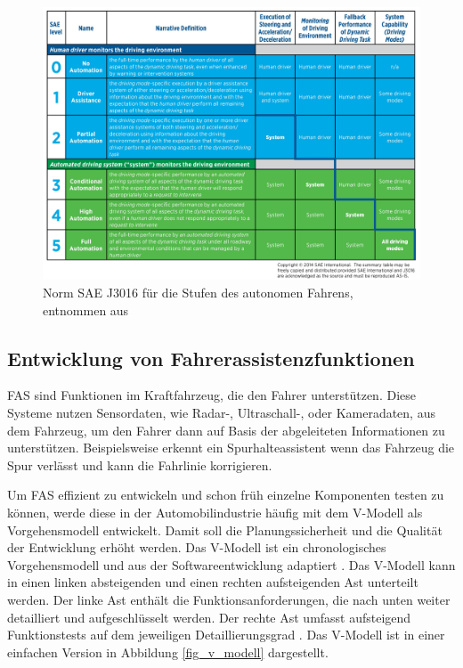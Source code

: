 \begin{figure}[h]
\centering
\includegraphics[scale=0.7]{images/level_autonomes_fahren.jpg}
\caption[Norm SAE J3016 für die Stufen des autonomen Fahrens]{Norm SAE J3016 für die Stufen des autonomen Fahrens, entnommen aus \cite{sae2014taxonomy}}
\label{fig_level_autonomes_fahren}
\end{figure}


\subsection{Entwicklung von Fahrerassistenzfunktionen}
\label{grundlagen_fahren_entwicklung}

\ac{FAS} sind Funktionen im Kraftfahrzeug, die den Fahrer unterstützen. Diese Systeme nutzen Sensordaten, wie Radar-, Ultraschall-, oder Kameradaten, aus dem Fahrzeug, um den Fahrer dann auf Basis der abgeleiteten Informationen zu unterstützen. Beispielsweise erkennt ein Spurhalteassistent wenn das Fahrzeug die Spur verlässt und kann die Fahrlinie korrigieren. 

Um \ac{FAS} effizient zu entwickeln und schon früh einzelne Komponenten testen zu können, werde diese in der Automobilindustrie häufig mit dem V-Modell als Vorgehensmodell entwickelt. Damit soll die Planungssicherheit und die Qualität der Entwicklung erhöht werden. Das V-Modell ist ein chronologisches Vorgehensmodell und aus der Softwareentwicklung adaptiert \cite{vmodell2005}. Das V-Modell kann in einen linken absteigenden und einen rechten aufsteigenden Ast unterteilt werden. Der linke Ast enthält die Funktionsanforderungen, die nach unten weiter detailliert und aufgeschlüsselt werden. Der rechte Ast umfasst aufsteigend Funktionstests auf dem jeweiligen Detaillierungsgrad \cite{hakuli2015virtuelle}. Das V-Modell ist in einer einfachen Version in Abbildung \ref{fig_v_modell} dargestellt.

